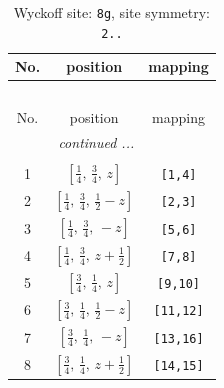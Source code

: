 \documentclass[fleqn,8pt]{jsarticle}
\begin{document}
\renewcommand{\arraystretch}{1.2}
\begin{longtable}{ccc}
\caption{Wyckoff site: {\tt 8g}, site symmetry: {\tt 2..}}
 \\
 \hline \hline
No. & position & mapping \\ \hline \endfirsthead

\multicolumn{2}{l}{\tablename\ \thetable{}} \\
 \hline \hline
No. & position & mapping \\ \hline \endhead

 \hline \hline
\multicolumn{2}{r}{\footnotesize\it continued ...} \\ \endfoot

 \hline \hline
\multicolumn{2}{r}{} \\ \endlastfoot

1 & $\left[ \frac{1}{4},\, \frac{3}{4},\, z \right]$ & {\tt [1,4]} \\ \hline
2 & $\left[ \frac{1}{4},\, \frac{3}{4},\, \frac{1}{2} - z \right]$ & {\tt [2,3]} \\ \hline
3 & $\left[ \frac{1}{4},\, \frac{3}{4},\, - z \right]$ & {\tt [5,6]} \\ \hline
4 & $\left[ \frac{1}{4},\, \frac{3}{4},\, z + \frac{1}{2} \right]$ & {\tt [7,8]} \\ \hline
5 & $\left[ \frac{3}{4},\, \frac{1}{4},\, z \right]$ & {\tt [9,10]} \\ \hline
6 & $\left[ \frac{3}{4},\, \frac{1}{4},\, \frac{1}{2} - z \right]$ & {\tt [11,12]} \\ \hline
7 & $\left[ \frac{3}{4},\, \frac{1}{4},\, - z \right]$ & {\tt [13,16]} \\ \hline
8 & $\left[ \frac{3}{4},\, \frac{1}{4},\, z + \frac{1}{2} \right]$ & {\tt [14,15]} \\
\end{longtable}
\renewcommand{\arraystretch}{1.2}
\end{document}
